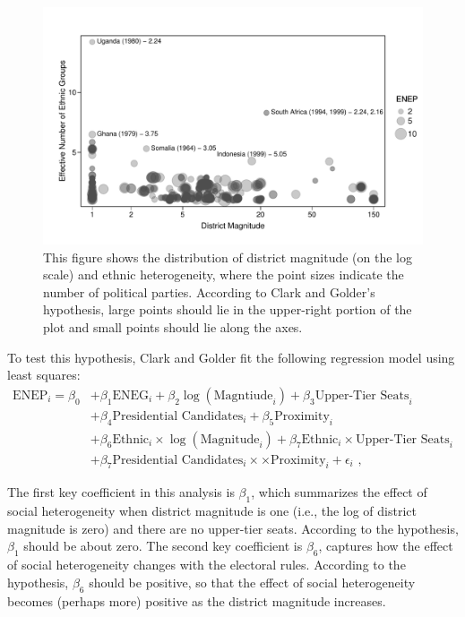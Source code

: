 \documentclass[12pt]{article}
\begin{document}
\begin{figure}[h!]
\begin{center}
\includegraphics[scale = 0.8]{figs/cg-scatter.pdf}
\caption{This figure shows the distribution of district magnitude (on the log scale) and ethnic heterogeneity, where the point sizes indicate the number of political parties. According to Clark and Golder's hypothesis, large points should lie in the upper-right portion of the plot and small points should lie along the axes.}\label{fig:cg-scatter}
\end{center}
\end{figure}

To test this hypothesis, Clark and Golder fit the following regression model using least squares:
\begin{align*}
\text{ENEP}_i = \beta_0 &+ \beta_1 \text{ENEG}_i + \beta_2 \log(\text{Magntiude}_i) + \beta_3 \text{Upper-Tier Seats}_i\\
                                                     &+\beta_4 \text{Presidential Candidates}_i + \beta_5 \text{Proximity}_i\\
                                                     &+ \beta_6 \text{Ethnic}_i \times \log (\text{Magnitude}_i) + \beta_7 \text{Ethnic}_i \times \text{Upper-Tier Seats}_i\\
                                                     &+ \beta_7 \text{Presidential Candidates}_i \times \times \text{Proximity}_i + \epsilon_i\text{ ,}
\end{align*}

The first key coefficient in this analysis is $\beta_1$, which summarizes the effect of social heterogeneity when district magnitude is one (i.e., the log of district magnitude is zero) and there are no upper-tier seats. According to the hypothesis, $\beta_1$ should be about zero. The second key coefficient is $\beta_6$, captures how the effect of social heterogeneity changes with the electoral rules. According to the hypothesis, $\beta_6$ should be positive, so that the effect of social heterogeneity becomes (perhaps more) positive as the district magnitude increases.
\end{document}
